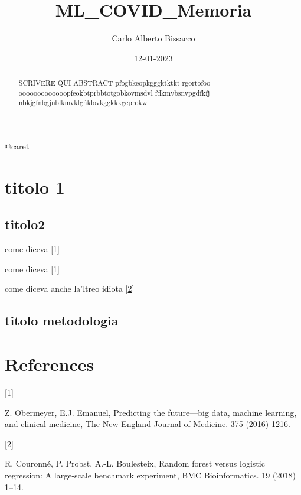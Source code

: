\documentclass[
]{article}
\title{ML\_COVID\_Memoria}
\author{Carlo Alberto Bissacco}
\date{12-01-2023}
\newlength{\cslhangindent}
\newlength{\csllabelwidth}
\newlength{\cslentryspacingunit} %
\newenvironment{CSLReferences}[2] %
 {%
  \setlength{\parindent}{0pt}
  \ifodd #1
  \let\oldpar\par
  \def\par{\hangindent=\cslhangindent\oldpar}
  \fi
  \setlength{\parskip}{#2\cslentryspacingunit}
 }%
 {}
\newcommand{\CSLLeftMargin}[1]{\parbox[t]{\csllabelwidth}{#1}}
\newcommand{\CSLRightInline}[1]{\parbox[t]{\linewidth - \csllabelwidth}{#1}\break}
\begin{document}
\maketitle
\begin{abstract}
SCRIVERE QUI ABSTRACT pfogbkeopkgggktktkt rgortofoo
ooooooooooooopfeokbtprbbtotgobkovmsdvl fdkmvbsnvpgdfkfj
nbkjgfnbgjnblkmvklgñklovkggkkkgeprokw
\end{abstract}

{
\hypersetup{linkcolor=}
\setcounter{tocdepth}{2}
\tableofcontents
}
\pagebreak

@caret

\pagebreak

\hypertarget{titolo-1}{%
\section{titolo 1}\label{titolo-1}}

\hypertarget{titolo2}{%
\subsection{titolo2}\label{titolo2}}

come diceva {[}\protect\hyperlink{ref-obermeyer2016predicting}{1}{]}

come diceva {[}\protect\hyperlink{ref-obermeyer2016predicting}{1}{]}

come diceva anche la'ltreo idiota
{[}\protect\hyperlink{ref-couronne2018random}{2}{]}

\hypertarget{titolo-metodologia}{%
\subsection{titolo metodologia}\label{titolo-metodologia}}

\pagebreak

\hypertarget{references}{%
\section*{References}\label{references}}

\hypertarget{refs}{}
\begin{CSLReferences}{0}{0}
\leavevmode{}%
\CSLLeftMargin{{[}1{]} }%
\CSLRightInline{Z. Obermeyer, E.J. Emanuel, Predicting the future---big
data, machine learning, and clinical medicine, The New England Journal
of Medicine. 375 (2016) 1216.}

\leavevmode{}%
\CSLLeftMargin{{[}2{]} }%
\CSLRightInline{R. Couronné, P. Probst, A.-L. Boulesteix, Random forest
versus logistic regression: A large-scale benchmark experiment, BMC
Bioinformatics. 19 (2018) 1--14.}

\end{CSLReferences}
\end{document}
